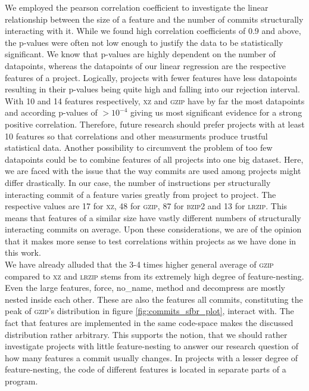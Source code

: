 We employed the pearson correlation coefficient to investigate the linear relationship between the size of a feature and the number of commits structurally interacting with it.
While we found high correlation coefficients of 0.9 and above, the p-values were often not low enough to justify the data to be statistically significant.
We know that p-values are highly dependent on the number of datapoints, whereas the datapoints of our linear regression are the respective features of a project.
Logically, projects with fewer features have less datapoints resulting in their p-values being quite high and falling into our rejection interval.
With 10 and 14 features respectively, \textsc{xz} and \textsc{gzip} have by far the most datapoints and according p-values of $>10^{-4}$ giving us most significant evidence for a strong positive correlation. 
Therefore, future research should prefer projects with at least 10 features so that correlations and other measurments produce trustful statistical data. 
Another possibility to circumvent the problem of too few datapoints could be to combine features of all projects into one big dataset.
Here, we are faced with the issue that the way commits are used among projects might differ drastically. 
In our case, the number of instructions per structurally interacting commit of a feature varies greatly from project to project.
The respective values are 17 for \textsc{xz}, 48 for \textsc{gzip}, 87 for \textsc{bzip2} and 13 for \textsc{lrzip}.
This means that features of a similar size have vastly different numbers of structurally interacting commits on average.
Upon these considerations, we are of the opinion that it makes more sense to test correlations within projects as we have done in this work.\\
We have already alluded that the 3-4 times higher general average of \textsc{gzip} compared to \textsc{xz} and \textsc{lrzip} stems from its extremely high degree of feature-nesting.
Even the large features, \textsf{force}, \textsf{no\_name}, \textsf{method} and \textsf{decompress} are mostly nested inside each other.
These are also the features all commits, constituting the peak of \textsc{gzip}'s distribution in figure \ref{fig:commits_sfbr_plot}, interact with. 
The fact that features are implemented in the same code-space makes the discussed distribution rather arbitrary.
This supports the notion, that we should rather investigate projects with little feature-nesting to answer our research question of how many features a commit usually changes.
In projects with a lesser degree of feature-nesting, the code of different features is located in separate parts of a program.
